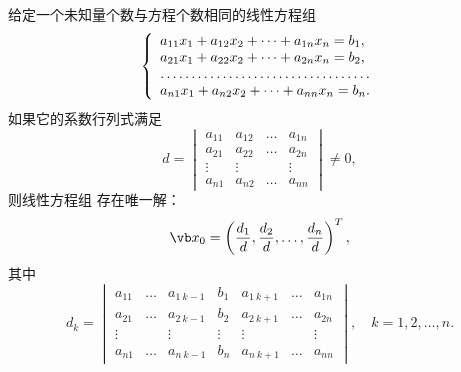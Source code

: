 \begin{theorem}[克拉默法则]\label{theorem:线性方程组.克拉默法则}
给定一个未知量个数与方程个数相同的线性方程组
\begin{equation}\label{equation:克拉默法则.线性方程组}
	\left\{ \begin{array}{l}
		a_{11}x_1 + a_{12}x_2 + \dotsb + a_{1n}x_n = b_1, \\
		a_{21}x_1 + a_{22}x_2 + \dotsb + a_{2n}x_n = b_2, \\
		\hdotsfor{1} \\
		a_{n1}x_1 + a_{n2}x_2 + \dotsb + a_{nn}x_n = b_n.
	\end{array} \right.
\end{equation}
如果它的系数行列式满足\[
	d
	=\begin{vmatrix}
		a_{11} & a_{12} & \dots & a_{1n} \\
		a_{21} & a_{22} & \dots & a_{2n} \\
		\vdots & \vdots & & \vdots \\
		a_{n1} & a_{n2} & \dots & a_{nn}
	\end{vmatrix}
	\neq 0,
\]
则线性方程组  存在唯一解：
\begin{equation}
	\x_0
	= \left( \frac{d_1}{d},\frac{d_2}{d},\dotsc,\frac{d_n}{d} \right)^T,
\end{equation}
其中\begin{equation}
	d_k
	= \begin{vmatrix}
		a_{11} & \dots & a_{1\ k-1} & b_1 & a_{1\ k+1} & \dots & a_{1n} \\
		a_{21} & \dots & a_{2\ k-1} & b_2 & a_{2\ k+1} & \dots & a_{2n} \\
		\vdots & & \vdots & \vdots & \vdots & & \vdots \\
		a_{n1} & \dots & a_{n\ k-1} & b_n & a_{n\ k+1} & \dots & a_{nn}
	\end{vmatrix},
	\quad k=1,2,\dotsc,n.
\end{equation}

\end{theorem}
